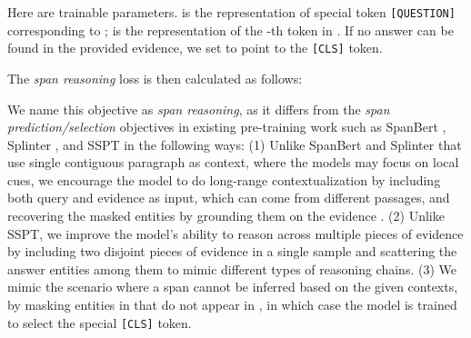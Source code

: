 \documentclass[11pt]{article}
\newcommand{\hs}[1]{\textcolor{blue}{Huan: #1}}
\newcommand{\nop}[1]{}
\begin{document}
\vspace{-1em}

\vspace{-0.5em}

Here  are trainable parameters.  is the representation of special token \texttt{[QUESTION]} corresponding to ;  is the representation of the -th token in . If no answer can be found in the provided evidence, we set  to point to the \texttt{[CLS]} token. 

The \textit{span reasoning} loss is then calculated as follows:

\vspace{-1.5em}

\nop{
The loss is then calculated as:


At inference time, we concatenate  and add special tokens to form the input sequence as , and then score all the start, end locations and rank all spans  by :


}
\nop{
More specifically, we use the base QA model described in Section \ref{sec:baseqa} to predict the start and end location of the masked entity  in . 
\nop{Since we have multiple "answers" masked with \texttt{[QUESTION]} tokens, a fixed query vector  as in Eqn. \ref{eqn:selection} is inapplicable. Instead, for each , we use the representation  of the associated \texttt{[QUESTION]} token to replace  as a dynamic query vector.}
The \textit{span reasoning} loss is then calculated as follows:

}

We name this objective as  \textit{span reasoning}, as it differs from the \textit{span prediction/selection} objectives in existing pre-training work such as SpanBert \cite{joshi-etal-2020-spanbert}, Splinter \cite{ram2021fewshot}, and SSPT \cite{glass-etal-2020-span} in the following ways:\nop{(1) Instead of predicting individual tokens as in the masked language modeling objective, we directly pre-train span selection, which is consistent with the downstream QA model. \hs{should we also compare with other span prediction objectives like the one in SpanBert to better stress what we mean by `grounded' span selection? in other words, what is `ungrounded' like?}} 
(1) Unlike SpanBert and Splinter that use single contiguous paragraph as context, where the models may focus on local cues, we encourage the model to do long-range contextualization by including both query and evidence as input, which can come from different passages, and recovering the masked entities {by grounding them} on the evidence . (2) Unlike SSPT, we improve the model's ability to reason across multiple pieces of evidence by including two disjoint pieces of evidence in a single sample and scattering the answer entities among them to mimic different types of reasoning chains. (3) \nop{Unlike all existing work, w}We mimic the scenario where a span cannot be inferred based on the given contexts, by masking entities in  that do not appear in , in which case the model is trained to select the special \texttt{[CLS]} token.
\end{document}
